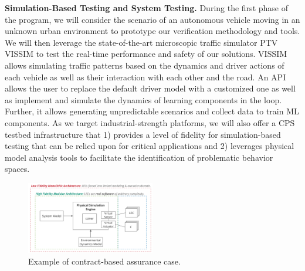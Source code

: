 \noindent\textbf{Simulation-Based Testing and System Testing.}  
During the first phase of the program, we will consider the scenario of an autonomous vehicle moving in an unknown urban environment to prototype our verification methodology and tools. 
We will then leverage the state-of-the-art microscopic traffic simulator PTV VISSIM to 
test the real-time performance and safety of our solutions. VISSIM allows 
simulating traffic patterns based on the dynamics and driver actions of each vehicle as well as their interaction with each other and the road. 
An API allows the user to replace the default driver model  with a customized one as well as implement and simulate the dynamics of learning components in the loop. Further, it allows generating unpredictable scenarios 
and collect data to train ML components. As we target industrial-strength platforms, we will also offer a CPS testbed infrastructure that 1) provides a level of fidelity for simulation-based testing that can be relied upon for critical applications and 2) leverages physical model analysis tools to facilitate the identification of problematic behavior spaces. 

\begin{figure}
\vspace{-10pt}
\begin{center}
\includegraphics[width=0.5\textwidth,trim={0in 0.15in 0in 0in},clip]{./TA1/simarch.png}
\vspace{-20pt}
\caption{Example of contract-based assurance case.}
\label{fig:arch}
\end{center}
\vspace{-25pt}
\end{figure}

